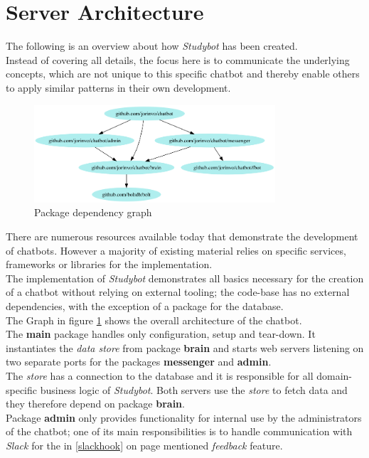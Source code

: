 \section{Server Architecture}


The following is an overview about how \emph{Studybot} has been created.
\\
Instead of covering all details, the focus here is to communicate the underlying concepts,
which are not unique to this specific chatbot and thereby enable others to apply similar patterns in their own development.
\\

\begin{figure}[h]
  \centering
  \includegraphics[width=0.8\textwidth]{images/internal-deps.png}
  \caption{Package dependency graph\protect\footnotemark}
	\label{fig:internal-deps}
\end{figure}

There are numerous resources available today that demonstrate the development of chatbots.
However a majority of existing material relies on specific services, frameworks or libraries for the implementation.
\\
The implementation of \emph{Studybot} demonstrates all basics necessary for the creation of a chatbot
without relying on external tooling;
the code-base has no external dependencies, with the exception of a package for the database.
\\

The Graph in figure \ref{fig:internal-deps} shows the overall architecture of the chatbot.
\\
The \textbf{main} package handles only configuration, setup and tear-down.
It instantiates the \emph{data store} from package \textbf{brain}
and starts web servers listening on two separate ports for the packages \textbf{messenger} and \textbf{admin}.
\\

The \emph{store} has a connection to the database and it is responsible for all domain-specific business logic of \emph{Studybot}.
Both servers use the \emph{store} to fetch data and they therefore depend on package \textbf{brain}.
\\
Package \textbf{admin} only provides functionality for internal use by the administrators of the chatbot;
one of its main responsibilities is to handle communication with \emph{Slack}
for the in \ref{slackhook} on page \pageref{slackhook} mentioned \emph{feedback} feature.
\\

